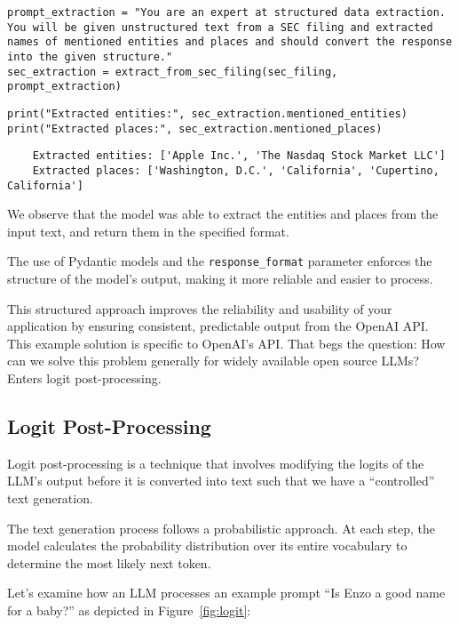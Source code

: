 \begin{verbatim}
prompt_extraction = "You are an expert at structured data extraction. You will be given unstructured text from a SEC filing and extracted names of mentioned entities and places and should convert the response into the given structure."
sec_extraction = extract_from_sec_filing(sec_filing, prompt_extraction)
\end{verbatim}


\begin{verbatim}
print("Extracted entities:", sec_extraction.mentioned_entities)
print("Extracted places:", sec_extraction.mentioned_places)
\end{verbatim}

\begin{verbatim}
    Extracted entities: ['Apple Inc.', 'The Nasdaq Stock Market LLC']
    Extracted places: ['Washington, D.C.', 'California', 'Cupertino, California']
\end{verbatim}


We observe that the model was able to extract the entities and places from the input text, and return them in the specified format.

The use of Pydantic models and the \texttt{response\_format} parameter enforces the structure of the model's output, making it more reliable and easier to process.

This structured approach improves the reliability and usability of your application by ensuring consistent, predictable output from the OpenAI API.
This example solution is specific to OpenAI's API. That begs the question: How can we solve this problem generally for widely available open source LLMs? Enters logit post-processing.

\subsection{Logit Post-Processing}

Logit post-processing is a technique that involves modifying the logits of the LLM's output before it is converted into text such that we have a ``controlled'' text generation.

The text generation process follows a probabilistic approach. At each step, the model calculates the probability distribution over its entire vocabulary to determine the most likely next token. 

Let's examine how an LLM processes an example prompt ``Is Enzo a good name for a baby?'' as depicted in Figure~\ref{fig:logit}:

